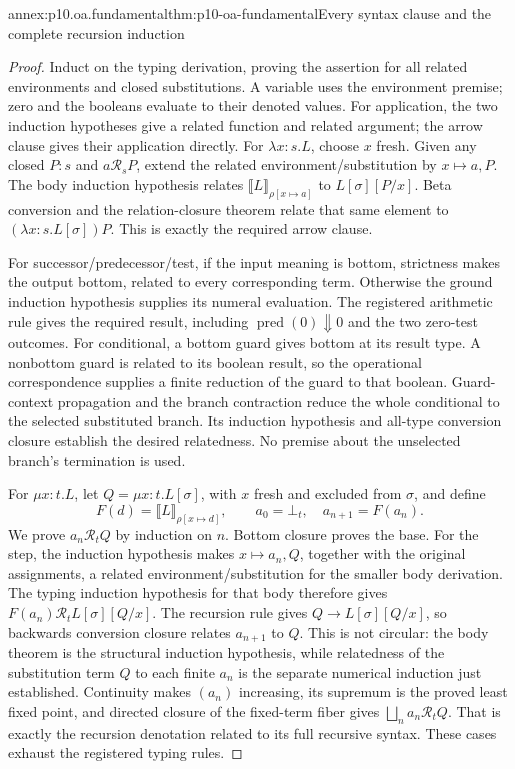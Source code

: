 \begin{annexitem}{annex:p10.oa.fundamental}{thm:p10-oa-fundamental}{Every syntax clause and the complete recursion induction}
\begin{proof}
Induct on the typing derivation, proving the assertion for all related
environments and closed substitutions. A variable uses the environment
premise; zero and the booleans evaluate to their denoted values. For
application, the two induction hypotheses give a related function and
related argument; the arrow clause gives their application directly.
For \(\lambda x:s.L\), choose \(x\) fresh. Given any closed
\(P:s\) and \(a\mathrel{\mathcal R_s}P\), extend the related
environment/substitution by \(x\mapsto a,P\). The body induction
hypothesis relates \(\llbracket L\rrbracket_{\rho[x\mapsto a]}\)
to \(L[\sigma][P/x]\). Beta conversion and the relation-closure
theorem relate that same element to \((\lambda x:s.L[\sigma])P\).
This is exactly the required arrow clause.

For successor/predecessor/test, if the input meaning is bottom, strictness
makes the output bottom, related to every corresponding term. Otherwise
the ground induction hypothesis supplies its numeral evaluation.
The registered arithmetic rule gives the required result, including
\(\operatorname{pred}(0)\Downarrow0\) and the two zero-test outcomes.
For conditional, a bottom guard gives bottom at its result type. A
nonbottom guard is related to its boolean result, so the operational
correspondence supplies a finite reduction of the guard to that boolean.
Guard-context propagation and the branch contraction reduce the whole
conditional to the selected substituted branch. Its induction hypothesis
and all-type conversion closure establish the desired relatedness.
No premise about the unselected branch's termination is used.

For \(\mu x:t.L\), let \(Q=\mu x:t.L[\sigma]\), with \(x\)
fresh and excluded from \(\sigma\), and define
\[
 F(d)=\llbracket L\rrbracket_{\rho[x\mapsto d]},\qquad
 a_0=\bot_t,\quad a_{n+1}=F(a_n).
\]
We prove \(a_n\mathrel{\mathcal R_t}Q\) by induction on \(n\).
Bottom closure proves the base. For the step, the induction hypothesis
makes \(x\mapsto a_n,Q\), together with the original assignments,
a related environment/substitution for the smaller body derivation.
The typing induction hypothesis for that body therefore gives
\(F(a_n)\mathrel{\mathcal R_t}L[\sigma][Q/x]\).
The recursion rule gives \(Q\to L[\sigma][Q/x]\), so backwards
conversion closure relates \(a_{n+1}\) to \(Q\).
This is not circular: the body theorem is the structural induction
hypothesis, while relatedness of the substitution term \(Q\) to each
finite \(a_n\) is the separate numerical induction just established.
Continuity makes \((a_n)\) increasing, its supremum is the proved
least fixed point, and directed closure of the fixed-term fiber gives
\(\bigsqcup_n a_n\mathrel{\mathcal R_t}Q\).
That is exactly the recursion denotation related to its full recursive
syntax. These cases exhaust the registered typing rules.
\end{proof}
\end{annexitem}

